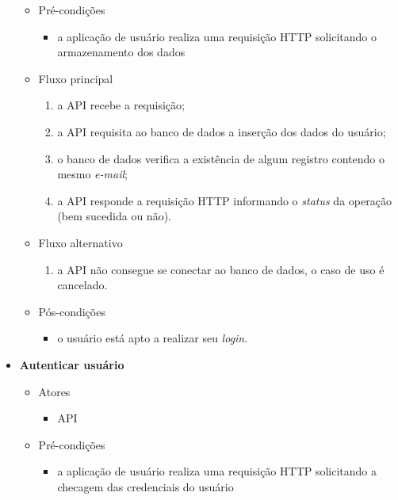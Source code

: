 \begin{itemize}
\begin{itemize}
		    \item Pré-condições
			    \begin{itemize}
			        \item a aplicação de usuário realiza uma requisição HTTP solicitando o armazenamento dos dados
			    \end{itemize}

		    \item Fluxo principal
			    \begin{enumerate}
			        \item a API recebe a requisição;
			        \item a API requisita ao banco de dados a inserção dos dados do usuário;
			        \item o banco de dados verifica a existência de algum registro contendo o mesmo \textit{e-mail}; 
        			\item a API responde a requisição HTTP informando o \textit{status} da operação (bem sucedida ou não).
			    \end{enumerate}
    
		    \item Fluxo alternativo
			    \begin{enumerate}
			        \item a API não consegue se conectar ao banco de dados, o caso de uso é cancelado.
			    \end{enumerate}
	
		    \item Pós-condições
			    \begin{itemize}
			       \item o usuário está apto a realizar seu \textit{login}.
			    \end{itemize}
		\end{itemize}

	\item \textbf{Autenticar usuário}

		\begin{itemize}
   			 \item Atores
			    \begin{itemize}
			        \item API
			    \end{itemize}

		    \item Pré-condições
			    \begin{itemize}
			        \item a aplicação de usuário realiza uma requisição HTTP solicitando a checagem das credenciais do usuário
			    \end{itemize}


\end{itemize}
\end{itemize}
